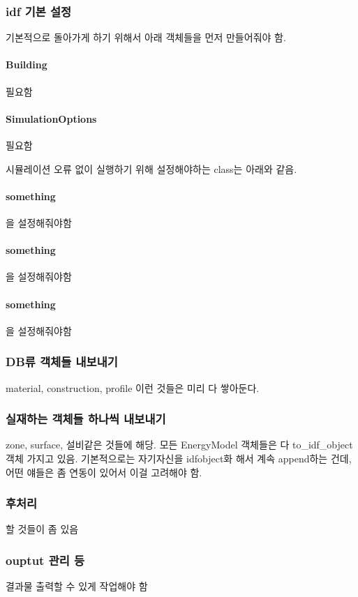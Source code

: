 \subsubsection{idf 기본 설정}
기본적으로 돌아가게 하기 위해서 아래 객체들을 먼저 만들어줘야 함.
\paragraph{Building} 필요함
\paragraph{SimulationOptions} 필요함

시뮬레이션 오류 없이 실행하기 위해 설정해야하는 class는 아래와 같음.
\paragraph{something} 을 설정해줘야함
\paragraph{something} 을 설정해줘야함
\paragraph{something} 을 설정해줘야함

\subsubsection{DB류 객체들 내보내기}
material, construction, profile 이런 것들은 미리 다 쌓아둔다.

\subsubsection{실재하는 객체들 하나씩 내보내기}
zone, surface, 설비같은 것들에 해당. 모든 EnergyModel 객체들은 다 to\_idf\_object 객체 가지고 있음. 기본적으로는 자기자신을 idfobject화 해서 계속 append하는 건데, 어떤 얘들은 좀 연동이 있어서 이걸 고려해야 함.

\subsubsection{후처리}
할 것들이 좀 있음

\subsubsection{ouptut 관리 등}
결과물 출력할 수 있게 작업해야 함

